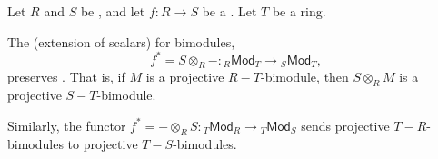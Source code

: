 \begin{proposition} \label{proposition:extension_of_scalars_preserves_projective_bimodules_over_rings}
Let $R$ and $S$ be , and let $f: R \to S$ be a . Let $T$ be a ring.

The  (extension of scalars) for bimodules,
\[
f^* = S \otimes_R - : {}_R\mathsf{Mod}_T \to {}_S\mathsf{Mod}_T,
\]
preserves . That is, if $M$ is a projective $R-T$-bimodule, then $S \otimes_R M$ is a projective $S-T$-bimodule.

Similarly, the functor $f^* = - \otimes_R S: {}_T\mathsf{Mod}_R \to {}_T\mathsf{Mod}_S$ sends projective $T-R$-bimodules to projective $T-S$-bimodules.
\end{proposition}